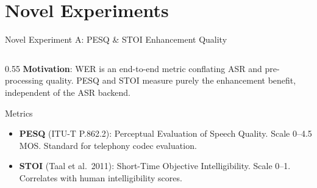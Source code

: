 \documentclass[aspectratio=169]{beamer}
\begin{document}
\section{Novel Experiments}
\begin{frame}{Novel Experiment A: PESQ \& STOI Enhancement Quality}
  \begin{columns}[T]
    \begin{column}{0.55\textwidth}
      \textbf{Motivation}: WER is an end-to-end metric conflating ASR and pre-processing quality. PESQ and STOI measure purely the enhancement benefit, independent of the ASR backend.

      \vspace{0.3cm}
      \begin{block}{Metrics}
        \begin{itemize}
          \item \textbf{PESQ} (ITU-T P.862.2): Perceptual Evaluation of Speech Quality. Scale 0--4.5 MOS. Standard for telephony codec evaluation.
          \item \textbf{STOI} (Taal et al.\ 2011): Short-Time Objective Intelligibility. Scale 0--1. Correlates with human intelligibility scores.
        \end{itemize}
      \end{block}


\end{column}
\end{columns}
\end{frame}
\end{document}

